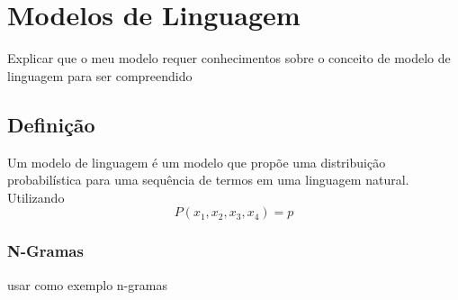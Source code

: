 \chapter{Modelos de Linguagem}
\label{ch:04}

Explicar que o meu modelo requer conhecimentos sobre o conceito de modelo de linguagem para ser compreendido




\section{Definição}

Um modelo de linguagem é um modelo que propõe uma distribuição probabilística para uma sequência de termos em uma linguagem natural. %
Utilizando 
\[
P(x_1,x_2,x_3,x_4) = p
\]







\subsection{N-Gramas}
usar como exemplo n-gramas

